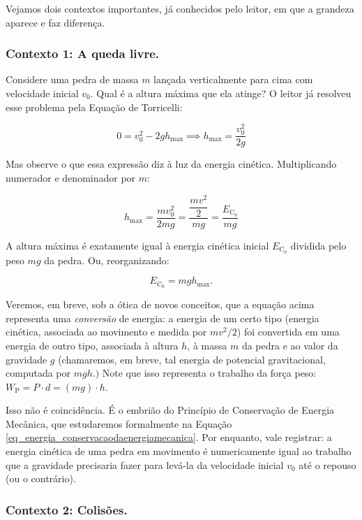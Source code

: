 Vejamos dois contextos importantes, já conhecidos pelo leitor, em que a grandeza aparece e faz diferença.
 
\medskip
\subsubsection{Contexto 1: A queda livre.}
\medskip
 
Considere uma pedra de massa $m$ lançada verticalmente para cima com velocidade
inicial $v_0$. Qual é a altura máxima que ela atinge? O leitor já resolveu esse problema pela Equação de Torricelli:
 
\[
    0 = v_0^2 - 2g h_{\max}
    \implies
    h_{\max} = \frac{v_0^2}{2g}
\]
 
Mas observe o que essa expressão diz à luz da energia cinética. Multiplicando
numerador e denominador por $m$:
 
\[
    h_{\max} = \frac{mv_0^2}{2mg} = \dfrac{\dfrac{mv^2}{2}}{mg} = \frac{E_{\text{C}_0}}{mg}
\]
 
A altura máxima é exatamente igual à energia cinética inicial $E_{\text{C}_0}$ dividida pelo peso $mg$ da pedra.
Ou, reorganizando:
 
\[
    E_{\text{C}_0} = m g h_{\max}.
\]

Veremos, em breve, sob a ótica de novos conceitos, que a equação acima representa uma \emph{conversão} de energia: a energia de um certo tipo (energia cinética, associada ao movimento e medida por $mv^2/2$) foi convertida em uma energia de outro tipo, associada à altura $h$, à massa $m$ da pedra e ao valor da gravidade $g$ (chamaremos, em breve, tal energia de potencial gravitacional, computada por $mgh.)$ Note que isso representa o trabalho da força peso: $W_\text{P} = P \cdot d = (mg) \cdot h$.
 
Isso não é coincidência. É o embrião do Princípio de Conservação de Energia
Mecânica, que estudaremos formalmente na Equação \eqref{eq_energia_conservacaodaenergiamecanica}. Por enquanto, vale registrar:
a energia cinética de uma pedra em movimento é numericamente igual ao trabalho que
a gravidade precisaria fazer para levá-la da velocidade inicial $v_0$ até o repouso (ou o contrário).


 
\medskip
\subsubsection{Contexto 2: Colisões.}
\medskip

